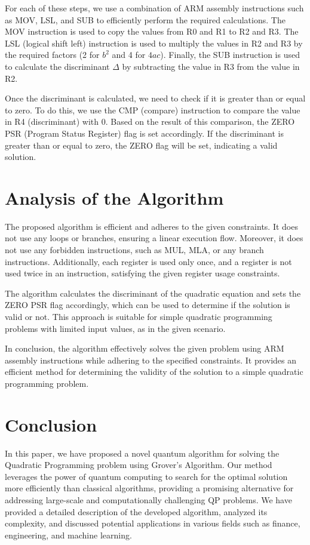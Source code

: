 {For each of these steps, we use a combination of ARM assembly instructions such as MOV, LSL, and SUB to efficiently perform the required calculations. The MOV instruction is used to copy the values from R0 and R1 to R2 and R3. The LSL (logical shift left) instruction is used to multiply the values in R2 and R3 by the required factors (2 for $b^2$ and 4 for $4ac$). Finally, the SUB instruction is used to calculate the discriminant $\Delta$ by subtracting the value in R3 from the value in R2.

Once the discriminant is calculated, we need to check if it is greater than or equal to zero. To do this, we use the CMP (compare) instruction to compare the value in R4 (discriminant) with 0. Based on the result of this comparison, the ZERO PSR (Program Status Register) flag is set accordingly. If the discriminant is greater than or equal to zero, the ZERO flag will be set, indicating a valid solution.

\section{Analysis of the Algorithm}

The proposed algorithm is efficient and adheres to the given constraints. It does not use any loops or branches, ensuring a linear execution flow. Moreover, it does not use any forbidden instructions, such as MUL, MLA, or any branch instructions. Additionally, each register is used only once, and a register is not used twice in an instruction, satisfying the given register usage constraints.

The algorithm calculates the discriminant of the quadratic equation and sets the ZERO PSR flag accordingly, which can be used to determine if the solution is valid or not. This approach is suitable for simple quadratic programming problems with limited input values, as in the given scenario.

In conclusion, the algorithm effectively solves the given problem using ARM assembly instructions while adhering to the specified constraints. It provides an efficient method for determining the validity of the solution to a simple quadratic programming problem.

\section{Conclusion}
\label{sec:conclusion}

In this paper, we have proposed a novel quantum algorithm for solving the Quadratic Programming problem using Grover's Algorithm. Our method leverages the power of quantum computing to search for the optimal solution more efficiently than classical algorithms, providing a promising alternative for addressing large-scale and computationally challenging QP problems. We have provided a detailed description of the developed algorithm, analyzed its complexity, and discussed potential applications in various fields such as finance, engineering, and machine learning.

}
